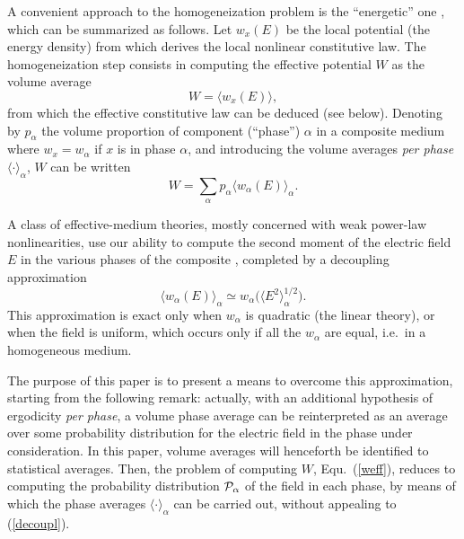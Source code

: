 A convenient approach to the homogeneization problem is the ``energetic'' 
one \cite{HILL63,PONT92b}, which can be summarized as follows. Let $w_x(E)$ 
be the local potential (the energy density) from which derives the local 
nonlinear constitutive law. The homogeneization step consists in computing 
the effective potential $W$ as the volume average
\begin{equation}
W=\langle w_x(E)\rangle,
\end{equation}
from which the effective constitutive law can be deduced (see below).
Denoting by $p_\alpha$ the volume proportion of component (``phase'') 
$\alpha$ in a composite medium where $w_x=w_\alpha$ if $x$ is in phase 
$\alpha$, and introducing the volume averages {\em per phase} 
$\langle\cdot\rangle_\alpha$, $W$ can be written
\begin{equation}
\label{weff}
W=\sum_\alpha p_\alpha \langle w_\alpha(E)\rangle_\alpha.
\end{equation}

A class of effective-medium theories, mostly concerned with weak 
power-law nonlinearities, use our ability to compute the second moment 
of the electric field $E$ in the various phases of the composite 
\cite{BERG78}, completed by a decoupling approximation \cite{ZENG88,HUI95a}
\begin{equation}
\label{decoupl}
\langle w_\alpha(E)\rangle_\alpha\simeq 
w_\alpha\bigr(\langle E^2\rangle_\alpha^{1/2}\bigl).
\end{equation}
This approximation is exact only when $w_\alpha$ is quadratic 
(the linear theory), or when the field is uniform, which occurs only 
if all the $w_\alpha$ are equal, i.e.\ in a homogeneous medium.

The purpose of this paper is to present a means to overcome this 
approximation, starting from the following remark: actually, with 
an additional hypothesis of ergodicity {\em per phase}, a volume phase 
average can be reinterpreted as an average over some probability 
distribution for the electric field in the phase under consideration. 
In this paper, volume averages  will henceforth be identified to 
statistical averages. Then, the problem of computing $W$, 
Equ.\ (\ref{weff}), reduces to computing the probability distribution 
${\cal P}_\alpha$ of the field in each phase, by means of which the 
phase averages $\langle\cdot\rangle_\alpha$ can be carried out, 
without appealing to (\ref{decoupl}). 

